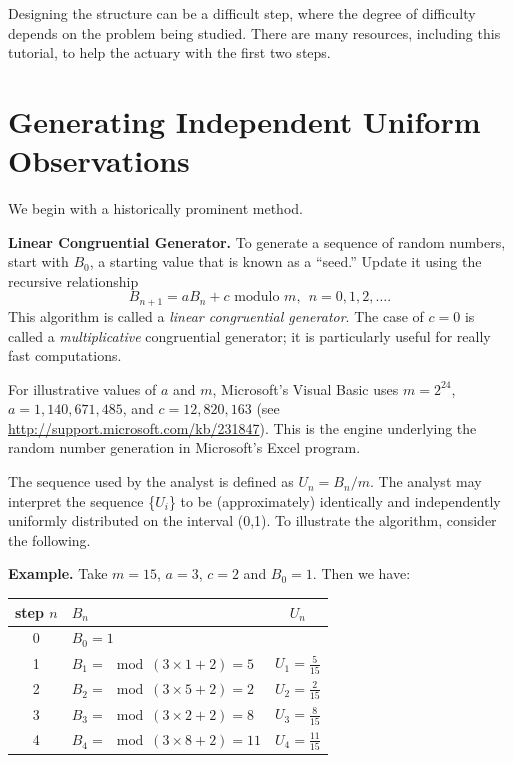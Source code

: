 \documentclass[]{book}
\theoremstyle{definition}
\theoremstyle{definition}
\theoremstyle{definition}
\theoremstyle{remark}
\begin{document}
Designing the structure can be a difficult step, where the degree of
difficulty depends on the problem being studied. There are many
resources, including this tutorial, to help the actuary with the first
two steps.

\section{Generating Independent Uniform
Observations}\label{generating-independent-uniform-observations}

We begin with a historically prominent method.

\textbf{Linear Congruential Generator.} To generate a sequence of random
numbers, start with \(B_0\), a starting value that is known as a
``seed.'' Update it using the recursive relationship
\[B_{n+1} = a B_n + c  \text{ modulo }m, ~~ n=0, 1, 2, \ldots .\] This
algorithm is called a \emph{linear congruential generator}. The case of
\(c=0\) is called a \emph{multiplicative} congruential generator; it is
particularly useful for really fast computations.

For illustrative values of \(a\) and \(m\), Microsoft's Visual Basic
uses \(m=2^{24}\), \(a=1,140,671,485\), and \(c = 12,820,163\) (see
\url{http://support.microsoft.com/kb/231847}). This is the engine
underlying the random number generation in Microsoft's Excel program.

The sequence used by the analyst is defined as \(U_n=B_n/m.\) The
analyst may interpret the sequence \{\(U_{i}\)\} to be (approximately)
identically and independently uniformly distributed on the interval
(0,1). To illustrate the algorithm, consider the following.

\textbf{Example.} Take \(m=15\), \(a=3\), \(c=2\) and \(B_0=1\). Then we
have:

\begin{longtable}[]{@{}clc@{}}
\toprule
step \(n\) & \(B_n\) & \(U_n\)\tabularnewline
\midrule
\endhead
\begin{minipage}[t]{0.32\columnwidth}\centering\strut
0\strut
\end{minipage} & \begin{minipage}[t]{0.32\columnwidth}\raggedright\strut
\(B_0=1\)\strut
\end{minipage} & \begin{minipage}[t]{0.32\columnwidth}\centering\strut
\strut
\end{minipage}\tabularnewline
1 & \(B_1 =\mod(3 \times 1 +2) = 5\) &
\(U_1 = \frac{5}{15}\)\tabularnewline
2 & \(B_2 =\mod(3 \times 5 +2) = 2\) &
\(U_2 = \frac{2}{15}\)\tabularnewline
3 & \(B_3 =\mod(3 \times 2 +2) = 8\) &
\(U_3 = \frac{8}{15}\)\tabularnewline
4 & \(B_4 =\mod(3 \times 8 +2) = 11\) &
\(U_4 = \frac{11}{15}\)\tabularnewline
\bottomrule
\end{longtable}
\end{document}

